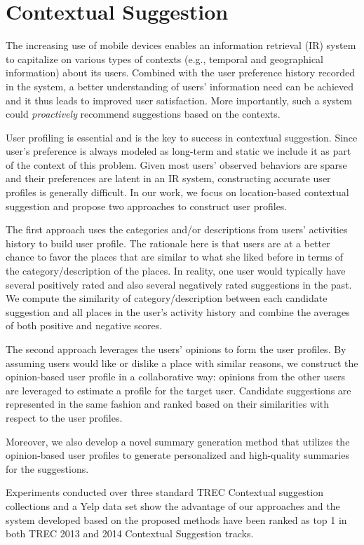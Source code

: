 \chapter{Contextual Suggestion}
The increasing use of mobile devices enables an information retrieval (IR) 
system to capitalize on various types of contexts 
(e.g., temporal and geographical information) about its users. 
Combined with the user preference history recorded in the system, 
a better understanding of users' information need can be achieved and 
it thus leads to improved user satisfaction. More importantly, such a 
system could {\em proactively} recommend suggestions based on the contexts.

User profiling is essential and is the key to success in contextual suggestion. 
Since user's preference is always modeled as long-term and static we include 
it as part of the context of this problem.
Given most users' observed behaviors are sparse and their preferences are 
latent in an IR system, constructing accurate user profiles is generally 
difficult. In our work, we focus on location-based contextual suggestion 
and propose two approaches to construct user profiles. 

The first approach uses the categories and/or descriptions from 
users' activities history to build user profile. The rationale here is 
that users are at a better chance to favor the places that are similar 
to what she liked before in terms of the category/description of the places. 
In reality, one user would typically have several positively rated and also 
several negatively rated suggestions in the past. We compute the similarity 
of category/description between each candidate suggestion and all 
places in the user's activity history and combine the averages of 
both positive and negative scores. 

The second approach leverages the users' opinions to form the user profiles. 
By assuming users would like or dislike a place with similar reasons, 
we construct the opinion-based user profile in a collaborative way: 
opinions from the other users are leveraged to estimate a profile for 
the target user. Candidate suggestions are represented in the same fashion 
and ranked based on their similarities with respect to the user profiles.

Moreover, we also develop a novel summary generation method that utilizes 
the opinion-based user profiles to generate personalized and high-quality 
summaries for the suggestions. 

Experiments conducted over three standard TREC Contextual suggestion 
collections and a Yelp data set show the advantage of our approaches and 
the system developed based on the proposed methods have been ranked as 
top 1 in both TREC 2013 and 2014 Contextual Suggestion tracks.

